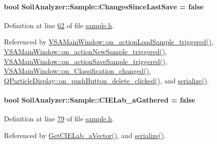 \paragraph[{Changes\+Since\+Last\+Save}]{\setlength{\rightskip}{0pt plus 5cm}bool Soil\+Analyzer\+::\+Sample\+::\+Changes\+Since\+Last\+Save = false}\label{class_soil_analyzer_1_1_sample_aee3c3cf30c0201c695d82ca3a8dd0d8b}


Definition at line \hyperlink{sample_8h_source_l00062}{62} of file \hyperlink{sample_8h_source}{sample.\+h}.



Referenced by \hyperlink{vsamainwindow_8cpp_source_l00475}{V\+S\+A\+Main\+Window\+::on\+\_\+action\+Load\+Sample\+\_\+triggered()}, \hyperlink{vsamainwindow_8cpp_source_l00361}{V\+S\+A\+Main\+Window\+::on\+\_\+action\+New\+Sample\+\_\+triggered()}, \hyperlink{vsamainwindow_8cpp_source_l00460}{V\+S\+A\+Main\+Window\+::on\+\_\+action\+Save\+Sample\+\_\+triggered()}, \hyperlink{vsamainwindow_8cpp_source_l00522}{V\+S\+A\+Main\+Window\+::on\+\_\+\+Classification\+\_\+changed()}, \hyperlink{qparticledisplay_8cpp_source_l00096}{Q\+Particle\+Display\+::on\+\_\+push\+Button\+\_\+delete\+\_\+clicked()}, and \hyperlink{sample_8h_source_l00085}{serialize()}.

\hypertarget{class_soil_analyzer_1_1_sample_a359783d2f39e5233ed4383dd28e8c477}{}
\paragraph[{C\+I\+E\+Lab\+\_\+a\+Gathered}]{\setlength{\rightskip}{0pt plus 5cm}bool Soil\+Analyzer\+::\+Sample\+::\+C\+I\+E\+Lab\+\_\+a\+Gathered = false\hspace{0.3cm}{\ttfamily [private]}}\label{class_soil_analyzer_1_1_sample_a359783d2f39e5233ed4383dd28e8c477}


Definition at line \hyperlink{sample_8h_source_l00079}{79} of file \hyperlink{sample_8h_source}{sample.\+h}.



Referenced by \hyperlink{sample_8cpp_source_l00094}{Get\+C\+I\+E\+Lab\+\_\+a\+Vector()}, and \hyperlink{sample_8h_source_l00085}{serialize()}.

\hypertarget{class_soil_analyzer_1_1_sample_ad5c684c7875dd7b5daca94925e469005}{}
